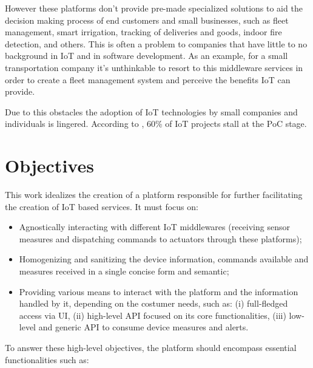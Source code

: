 However these platforms don't provide pre-made specialized solutions to aid the decision making process of end customers and small businesses, such as fleet management, smart irrigation, tracking of deliveries and goods, indoor fire detection, and others. This is often a problem to companies that have little to no background in IoT and in software development. As an example, for a small transportation company it's unthinkable to resort to this middleware services in order to create a fleet management system and perceive the benefits \gls{IoT} can provide.

Due to this obstacles the adoption of \gls{IoT} technologies by small companies and individuals is lingered. According to \cite{iot-fail}, 60\% of \gls{IoT} projects stall at the \gls{PoC} stage.

\section{Objectives}
\label{sec:introduction:objectives}

This work idealizes the creation of a platform responsible for further facilitating the creation of \gls{IoT} based services. It must focus on:

\begin{itemize}
    \item Agnostically interacting with different \gls{IoT} middlewares (receiving sensor measures and dispatching commands to actuators through these platforms);
    \item Homogenizing and sanitizing the device information, commands available and measures received in a single concise form and semantic;
    \item Providing various means to interact with the platform and the information handled by it, depending on the costumer needs, such as: (i) full-fledged access via \gls{UI}, (ii) high-level \gls{API} focused on its core functionalities, (iii) low-level and generic \gls{API} to consume device measures and alerts.
\end{itemize}

To answer these high-level objectives, the platform should encompass essential functionalities such as:

